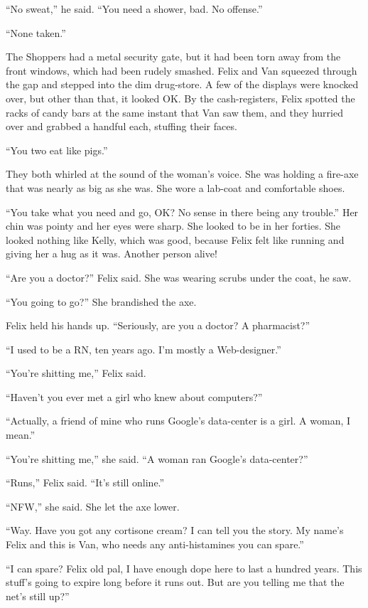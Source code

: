 “No sweat,” he said. “You need a shower, bad. No offense.”

“None taken.”

The Shoppers had a metal security gate, but it had been torn away
from the front windows, which had been rudely smashed. Felix and
Van squeezed through the gap and stepped into the dim drug-store. A
few of the displays were knocked over, but other than that, it
looked OK. By the cash-registers, Felix spotted the racks of candy
bars at the same instant that Van saw them, and they hurried over
and grabbed a handful each, stuffing their faces.

“You two eat like pigs.”

They both whirled at the sound of the woman’s voice. She was
holding a fire-axe that was nearly as big as she was. She wore a
lab-coat and comfortable shoes.

“You take what you need and go, OK? No sense in there being any
trouble.” Her chin was pointy and her eyes were sharp. She looked
to be in her forties. She looked nothing like Kelly, which was
good, because Felix felt like running and giving her a hug as it
was. Another person alive!

“Are you a doctor?” Felix said. She was wearing scrubs under the
coat, he saw.

“You going to go?” She brandished the axe.

Felix held his hands up. “Seriously, are you a doctor? A
pharmacist?”

“I used to be a RN, ten years ago. I’m mostly a Web-designer.”

“You’re shitting me,” Felix said.

“Haven’t you ever met a girl who knew about computers?”

“Actually, a friend of mine who runs Google’s data-center is a
girl. A woman, I mean.”

“You’re shitting me,” she said. “A woman ran Google’s
data-center?”

“Runs,” Felix said. “It’s still online.”

“NFW,” she said. She let the axe lower.

“Way. Have you got any cortisone cream? I can tell you the story.
My name’s Felix and this is Van, who needs any anti-histamines you
can spare.”

“I can spare? Felix old pal, I have enough dope here to last a
hundred years. This stuff’s going to expire long before it runs
out. But are you telling me that the net’s still up?”

